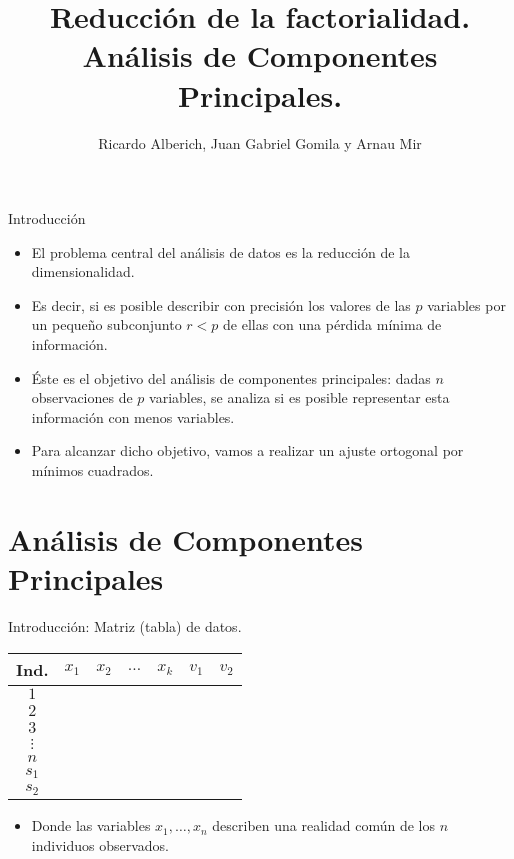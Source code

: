 \documentclass[
  spanish,
  ignorenonframetext,
]{beamer}
\title{Reducción de la factorialidad. Análisis de Componentes
Principales.}
\author{Ricardo Alberich, Juan Gabriel Gomila y Arnau Mir}
\date{}
\providecommand{\tightlist}{%
  \setlength{\itemsep}{0pt}\setlength{\parskip}{0pt}}
\begin{document}
\frame{\titlepage}

\begin{frame}{Introducción}
\protect\hypertarget{introducciuxf3n}{}
\begin{itemize}
\tightlist
\item
  El problema central del análisis de datos es la reducción de la
  dimensionalidad.
\item
  Es decir, si es posible describir con precisión los valores de las
  \(p\) variables por un pequeño subconjunto \(r<p\) de ellas con una
  pérdida mínima de información.
\item
  Éste es el objetivo del análisis de componentes principales: dadas
  \(n\) observaciones de \(p\) variables, se analiza si es posible
  representar esta información con menos variables.
\item
  Para alcanzar dicho objetivo, vamos a realizar un ajuste ortogonal por
  mínimos cuadrados.
\end{itemize}
\end{frame}

\hypertarget{anuxe1lisis-de-componentes-principales}{%
\section{Análisis de Componentes
Principales}\label{anuxe1lisis-de-componentes-principales}}

\begin{frame}{Introducción: Matriz (tabla) de datos.}
\protect\hypertarget{introducciuxf3n-matriz-tabla-de-datos.}{}
\begin{tabular}{c|cccc|cc|}
Ind. & $x_1$ & $x_2$ & $\ldots$ & $x_k$ & $v_1$ & $v_2$\\
  \hline
$1$  & & & & & & \\
 $2$  & & & & & & \\
 $3$ & & & & & & \\
 $\vdots$   & & & & & & \\
  $n$  & & & & & & \\ \hline
   $s_1$  & & & & &  \multicolumn{2}{|c}{}\\
   $s_2$ & & & & &  \multicolumn{2}{|c}{}\\
    \cline{1-5}
\end{tabular}

\begin{itemize}
\tightlist
\item
  Donde las variables \(x_1,\ldots, x_n\) describen una realidad común
  de los \(n\) individuos observados.
\end{itemize}
\end{frame}
\end{document}
